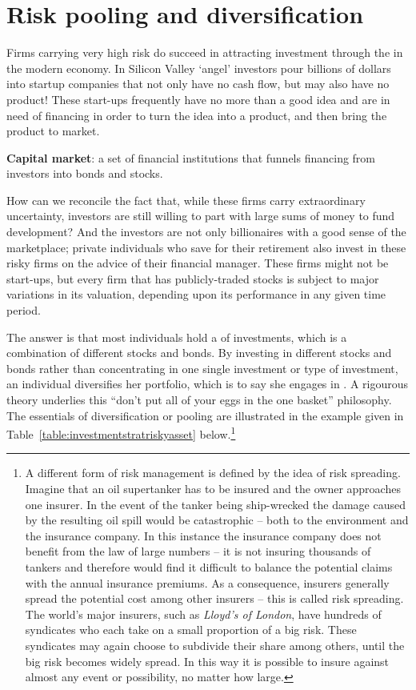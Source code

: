 \section{Risk pooling and diversification}\label{sec:ch7sec4}

Firms carrying very high risk do succeed in attracting investment through
the  in the modern economy. In Silicon Valley
`angel' investors pour billions of dollars into startup companies that not
only have no cash flow, but may also have no product! These start-ups
frequently have no more than a good idea and are in need of financing in
order to turn the idea into a product, and then bring the product to market.

\begin{DefBox}
\textbf{Capital market}: a set of financial institutions that funnels financing from investors into bonds and stocks.
\end{DefBox}

How can we reconcile the fact that, while these firms carry extraordinary
uncertainty, investors are still willing to part with large sums of money to
fund development? And the investors are not only billionaires with a good
sense of the marketplace; private individuals who save for their retirement
also invest in these risky firms on the advice of their financial manager.
These firms might not be start-ups, but every firm that has publicly-traded
stocks is subject to major variations in its valuation, depending upon its
performance in any given time period.

The answer is that most individuals hold a  of
investments, which is a combination of different stocks and bonds. By
investing in different stocks and bonds rather than concentrating in one
single investment or type of investment, an individual diversifies her
portfolio, which is to say she engages in . A
rigourous theory underlies this ``don't put all of your eggs
in the one basket'' philosophy. The essentials of
diversification or pooling are illustrated in the example given in
Table~\ref{table:investmentstratriskyasset} below.\footnote{A different
form of risk management is defined by the idea of risk
spreading. Imagine that an oil supertanker has to be insured and the owner
approaches one insurer. In the event of the tanker being ship-wrecked the
damage caused by the resulting oil spill would be catastrophic -- both to
the environment and the insurance company. In this instance the insurance
company does not benefit from the law of large numbers -- it is not insuring
thousands of tankers and therefore would find it difficult to balance
the potential claims with the annual insurance premiums. As a consequence, 
insurers generally spread the potential cost among other insurers -- %
this is called risk spreading. The world's major insurers, such as
\textit{Lloyd's of London}, have hundreds of syndicates who each take on a small
proportion of a big risk. These syndicates may again choose to subdivide
their share among others, until the big risk becomes widely spread. In this
way it is possible to insure against almost any event or possibility, no
matter how large.}

